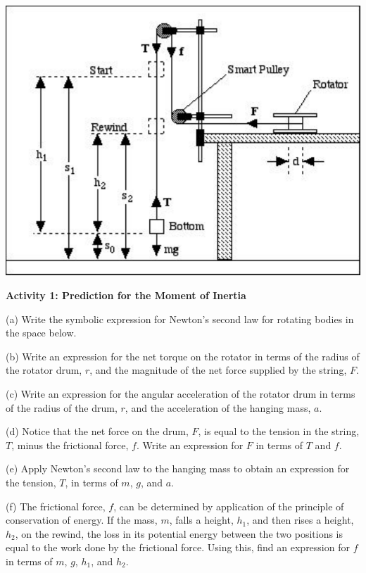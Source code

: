 \vspace{0.3cm}
{\par\centering \includegraphics{moment_inertia/moment_inertia_fig1.pdf} \par}
\vspace{0.3cm}

\pagebreak[2]
\textbf{Activity 1: Prediction for the Moment of Inertia} 

(a) Write the symbolic expression for Newton's second law for rotating bodies
in the space below.
\answerspace{10mm}

(b) Write an expression for the net torque on the rotator in terms of the radius
of the rotator drum, $r$, and the magnitude of the net force supplied by the string,
$F$.
\answerspace{10mm}

(c) Write an expression for the angular acceleration of the rotator drum in
terms of the radius of the drum, $r$, and the acceleration of the hanging mass,
$a$.
\answerspace{10mm}

(d) Notice that the net force on the drum, $F$, is equal to the tension in the
string, $T$, minus the frictional force, $f$. Write an expression for 
$F$ in terms
of $T$ and $f$.
\answerspace{10mm}

(e) Apply Newton's second law to the hanging mass to obtain an expression for
the tension, $T$, in terms of $m$, $g$, and $a$.
\answerspace{20mm}

(f) The frictional force, $f$, can be determined by application of the principle
of conservation of energy. If the mass, $m$, falls a height, \( h_{1} \), and
then rises a height, \( h_{2} \), on the rewind, the loss in its potential
energy between the two positions is equal to the work done by the frictional
force. Using this, find an expression for $f$ in terms of $m$, $g$, \( h_{1} \),
and \( h_{2} \).
\answerspace{20mm}

